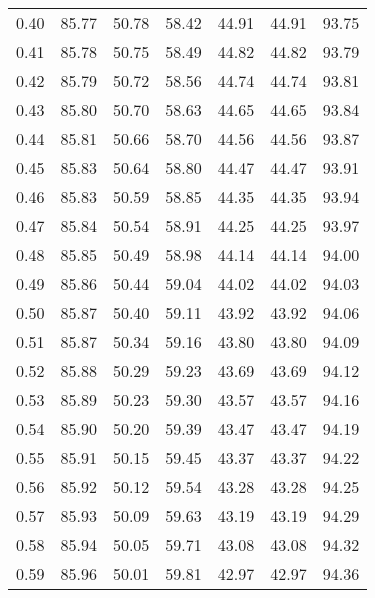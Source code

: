 \begin{tabular}{|c|c|c|c|c|c|c|}
      0.40 &     85.77 &     50.78 &      58.42 &   44.91 &      44.91 &         93.75 \\
      0.41 &     85.78 &     50.75 &      58.49 &   44.82 &      44.82 &         93.79 \\
      0.42 &     85.79 &     50.72 &      58.56 &   44.74 &      44.74 &         93.81 \\
      0.43 &     85.80 &     50.70 &      58.63 &   44.65 &      44.65 &         93.84 \\
      0.44 &     85.81 &     50.66 &      58.70 &   44.56 &      44.56 &         93.87 \\
      0.45 &     85.83 &     50.64 &      58.80 &   44.47 &      44.47 &         93.91 \\
      0.46 &     85.83 &     50.59 &      58.85 &   44.35 &      44.35 &         93.94 \\
      0.47 &     85.84 &     50.54 &      58.91 &   44.25 &      44.25 &         93.97 \\
      0.48 &     85.85 &     50.49 &      58.98 &   44.14 &      44.14 &         94.00 \\
      0.49 &     85.86 &     50.44 &      59.04 &   44.02 &      44.02 &         94.03 \\
      0.50 &     85.87 &     50.40 &      59.11 &   43.92 &      43.92 &         94.06 \\
      0.51 &     85.87 &     50.34 &      59.16 &   43.80 &      43.80 &         94.09 \\
      0.52 &     85.88 &     50.29 &      59.23 &   43.69 &      43.69 &         94.12 \\
      0.53 &     85.89 &     50.23 &      59.30 &   43.57 &      43.57 &         94.16 \\
      0.54 &     85.90 &     50.20 &      59.39 &   43.47 &      43.47 &         94.19 \\
      0.55 &     85.91 &     50.15 &      59.45 &   43.37 &      43.37 &         94.22 \\
      0.56 &     85.92 &     50.12 &      59.54 &   43.28 &      43.28 &         94.25 \\
      0.57 &     85.93 &     50.09 &      59.63 &   43.19 &      43.19 &         94.29 \\
      0.58 &     85.94 &     50.05 &      59.71 &   43.08 &      43.08 &         94.32 \\
      0.59 &     85.96 &     50.01 &      59.81 &   42.97 &      42.97 &         94.36 \\

\end{tabular}
